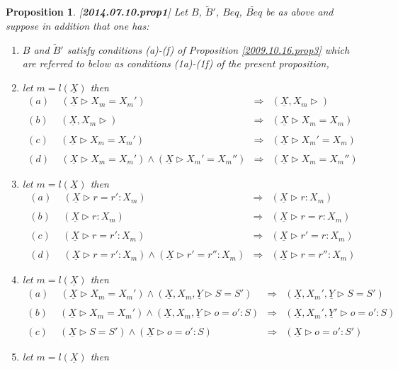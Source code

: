 \documentclass[11pt]{article}
\newtheorem{proposition}{Proposition}[subsection]
\newcommand{\llabel}[1]{\label{#1}[{\bf #1}]}
\newcommand{\uu}{\underline}
\newcommand{\wt}{\widetilde}
\newcommand{\spc}{{\,\,\,\,\,\,\,}}
\newcommand{\impl}{{\Rightarrow}}
\begin{document}
%
\begin{proposition}
\llabel{2014.07.10.prop1}
%
Let $B$, $\wt{B}'$, $Beq$, $\wt{Beq}$ be as above and suppose in addition that one has:
%
\begin{enumerate}
\item $B$ and $\wt{B}'$ satisfy conditions (a)-(f) of Proposition \ref{2009.10.16.prop3} which are referred to below as conditions (1a)-(1f) of the present proposition,
\item let $m=l(\uu{X})$ then 
%
$$
\begin{array}{lcl}
(a)\spc(\uu{X}\rhd X_m=X_m')&\impl& (\uu{X},X_m\rhd)\\\\
(b)\spc(\uu{X},X_m\rhd)&\impl& (\uu{X}\rhd X_m=X_m)\\\\
(c )\spc(\uu{X}\rhd X_m=X_m')&\impl&(\uu{X}\rhd X_m'=X_m)\\\\
(d)\spc(\uu{X}\rhd X_m=X_m')\wedge(\uu{X}\rhd X_m'=X_m'')&\impl&(\uu{X}\rhd X_m=X_m'')
\end{array}
$$
%
\item let $m=l(\uu{X})$ then 
%
$$
\begin{array}{lcl}
(a)\spc(\uu{X}\rhd r=r':X_m)&\impl& (\uu{X}\rhd r:X_m)\\\\
(b)\spc(\uu{X}\rhd r:X_m)&\impl&(\uu{X}\rhd r=r:X_m)\\\\
(c )\spc(\uu{X}\rhd r=r':X_m)&\impl&(\uu{X}\rhd r'=r:X_m)\\\\
(d)\spc (\uu{X}\rhd r=r':X_m)\wedge(\uu{X}\rhd r'=r'':X_m)&\impl&(\uu{X}\rhd r=r'':X_m)
\end{array}
$$
%
\item let $m=l(\uu{X})$ then 
%
$$
\begin{array}{lcl}
(a)\spc (\uu{X}\rhd X_m=X_m')\wedge(\uu{X},X_m,\uu{Y}\rhd S=S')&\impl&(\uu{X},X_m',\uu{Y}\rhd S=S')\\\\
(b)\spc (\uu{X}\rhd X_m=X_m')\wedge(\uu{X},X_m,\uu{Y}\rhd o=o':S)&\impl&(\uu{X},X_m',\uu{Y}'\rhd o=o':S)\\\\
(c )\spc (\uu{X}\rhd S=S')\wedge(\uu{X}\rhd o=o':S)&\impl&(\uu{X}\rhd o=o':S')
\end{array}
$$
%
\item let $m=l(\uu{X})$ then 
%
$$
\begin{array}{lcl}

\end{array}$$
\end{enumerate}
\end{proposition}
\end{document}
